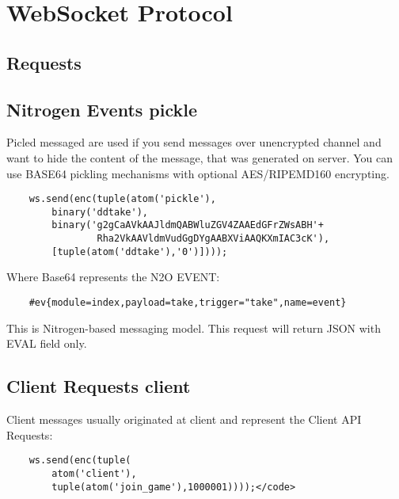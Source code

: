 \section{WebSocket Protocol}

\subsection*{Requests}

\subsection{Nitrogen Events {\bf pickle}}

Picled messaged are used if you send messages over unencrypted
channel and want to hide the content of the message,
that was generated on server. You can use BASE64 pickling mechanisms
with optional AES/RIPEMD160 encrypting.

\vspace{1\baselineskip}
\begin{lstlisting}
    ws.send(enc(tuple(atom('pickle'),
        binary('ddtake'),
        binary('g2gCaAVkAAJldmQABWluZGV4ZAAEdGFrZWsABH'+
                Rha2VkAAVldmVudGgDYgAABXViAAQKXmIAC3cK'),
        [tuple(atom('ddtake'),'0')])));
\end{lstlisting}
\vspace{1\baselineskip}

Where Base64 represents the N2O EVENT:

\vspace{1\baselineskip}
\begin{lstlisting}
    #ev{module=index,payload=take,trigger="take",name=event}
\end{lstlisting}
\vspace{1\baselineskip}

This is Nitrogen-based messaging model.
This request will return JSON with EVAL field only.

\subsection{Client Requests {\bf client}}

Client messages usually originated at client and represent the Client API Requests:

\vspace{1\baselineskip}
\begin{lstlisting}
    ws.send(enc(tuple(
        atom('client'),
        tuple(atom('join_game'),1000001))));</code>
\end{lstlisting}
\vspace{1\baselineskip}

